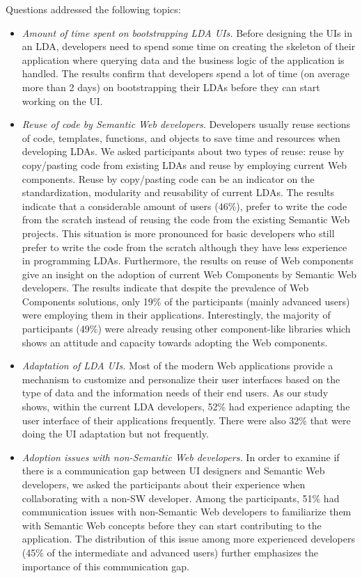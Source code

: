 \documentclass{acm_proc_article-sp}
\begin{document}
Questions addressed the following topics:
\begin{itemize}

\item
\emph{Amount of time spent on bootstrapping LDA UIs.}
Before designing the UIs in an LDA, developers need to spend some time on creating the skeleton of their application where querying data and the business logic of the application is handled.
The results confirm that developers spend a lot of time (on average more than 2 days) on bootstrapping their LDAs before they can start working on the UI.
 
\item
\emph{Reuse of code by Semantic Web developers.}
Developers usually reuse sections of code, templates, functions, and objects to save time and resources when developing LDAs.
We asked participants about two types of reuse: reuse by copy/pasting code from existing LDAs and reuse by employing current Web components.
Reuse by copy/pasting code can be an indicator on the standardization, modularity and reusability of current LDAs.
The results indicate that a considerable amount of users (46\%), prefer to write the code from the scratch instead of reusing the code from the existing Semantic Web projects.
This situation is more pronounced for basic developers who still prefer to write the code from the scratch although they have less experience in programming LDAs.
Furthermore, the results on reuse of Web components give an insight on the adoption of current Web Components by Semantic Web developers.
The results indicate that despite the prevalence of Web Components solutions, only 19\% of the participants (mainly advanced users) were employing them in their applications.
Interestingly, the majority of participants (49\%) were already reusing other component-like libraries which shows an attitude and capacity towards adopting the Web components.

\item
\emph{Adaptation of LDA UIs.}
Most of the modern Web applications provide a mechanism to customize and personalize their user interfaces based on the type of data and the information needs of their end users.
As our study shows, within the current LDA developers, 52\% had experience adapting the user interface of their applications frequently. There were also 32\% that were doing the UI adaptation but not frequently.

\item
\emph{Adoption issues with non-Semantic Web developers.}
In order to examine if there is a communication gap between UI designers and Semantic Web developers, we asked the participants about their experience when collaborating with a non-SW developer.
Among the participants, 51\% had communication issues with non-Semantic Web developers to familiarize them with Semantic Web concepts before they can start contributing to the application.
The distribution of this issue among more experienced developers (45\% of the intermediate and advanced users) further emphasizes the importance of this communication gap.\\~\\

\end{itemize}
\end{document}
